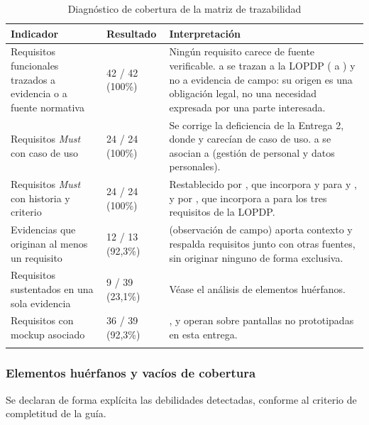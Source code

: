 \begin{longtable}{|L{5.6cm}|C{2.4cm}|L{6.8cm}|}
\hline
{}\textbf{Indicador} & \textbf{Resultado} & \textbf{Interpretación} \\
\hline
\endhead
Requisitos funcionales trazados a evidencia o a fuente normativa & 42 / 42 (100\%) & Ningún requisito carece de fuente verificable.  a  se trazan a la LOPDP ( a ) y no a evidencia de campo: su origen es una obligación legal, no una necesidad expresada por una parte interesada. \\ \hline
Requisitos \emph{Must} con caso de uso & 24 / 24 (100\%) & Se corrige la deficiencia de la Entrega 2, donde  y  carecían de caso de uso.  a  se asocian a  (gestión de personal y datos personales). \\ \hline
Requisitos \emph{Must} con historia y criterio & 24 / 24 (100\%) & Restablecido por , que incorpora  y  para  y , y por , que incorpora  a  para los tres requisitos de la LOPDP. \\ \hline
Evidencias que originan al menos un requisito & 12 / 13 (92,3\%) &  (observación de campo) aporta contexto y respalda requisitos junto con otras fuentes, sin originar ninguno de forma exclusiva. \\ \hline
Requisitos sustentados en una sola evidencia & 9 / 39 (23,1\%) & Véase el análisis de elementos huérfanos. \\ \hline
Requisitos con mockup asociado & 36 / 39 (92,3\%) & ,  y  operan sobre pantallas no prototipadas en esta entrega. \\ \hline
\caption{Diagnóstico de cobertura de la matriz de trazabilidad}
\end{longtable}

\subsubsection{Elementos huérfanos y vacíos de cobertura}

Se declaran de forma explícita las debilidades detectadas, conforme al criterio de completitud de la
guía.

